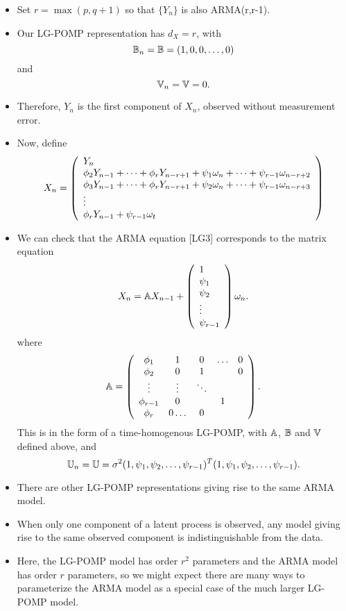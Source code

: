 \documentclass[]{article}
\begin{document}
\begin{itemize}
\item
  Set \(r=\max(p,q+1)\) so that \(\{Y_n\}\) is also ARMA(r,r-1).
\item
  Our LG-POMP representation has \(d_X=r\), with
  \[\mathbb{B}_n = \mathbb{B} = (1,0,0,\dots,0)\] and
  \[\mathbb{V}_n = \mathbb{V} = 0.\]
\item
  Therefore, \(Y_n\) is the first component of \(X_n\), observed without
  measurement error.
\item
  Now, define \[ X_n = \left(\begin{array}{l}
  Y_n \\
  \phi_2 Y_{n-1} + \dots + \phi_r Y_{n-r+1} + \psi_1 \omega_n + \dots +\psi_{r-1} \omega_{n-r+2}
  \\
  \phi_3 Y_{n-1} + \dots + \phi_r Y_{n-r+1} + \psi_2 \omega_n + \dots +\psi_{r-1} \omega_{n-r+3}
  \\
  \vdots
  \\
  \phi_r Y_{n-1} + \psi_{r-1} \omega_t
  \end{array}\right)\]
\item
  We can check that the ARMA equation {[}LG3{]} corresponds to the
  matrix equation \[ X_{n} = \mathbb{A} X_{n-1} + \left(\begin{array}{l}
  1 \\
  \psi_1\\
  \psi_2\\
  \vdots\\
  \psi_{r-1}
  \end{array}\right) \omega_n.
  \] where \[
  \mathbb{A} = 
  \left(\begin{array}{ccccc}
  \phi_1 & 1 & 0 & \ldots & 0 \\
  \phi_2 & 0 & 1 &       & 0 \\
  \vdots & \vdots& \ddots & \\
  \phi_{r-1} & 0 & & 1 \\
  \phi_{r} & 0 \ldots & 0
  \end{array}\right).\] This is in the form of a time-homogenous
  LG-POMP, with \(\mathbb{A}\), \(\mathbb{B}\) and \(\mathbb{V}\) defined above, and
  \[\mathbb{U}_n = \mathbb{U} = \sigma^2 (1, \psi_1,\psi_2,\dots,\psi_{r-1})^{\scriptsize{T}}(1, \psi_1,\psi_2,\dots,\psi_{r-1}).\]
\item
  There are other LG-POMP representations giving rise to the same ARMA
  model.
\item
  When only one component of a latent process is observed, any model
  giving rise to the same observed component is indistinguishable from
  the data.
\item
  Here, the LG-POMP model has order \(r^2\) parameters and the ARMA
  model has order \(r\) parameters, so we might expect there are many
  ways to parameterize the ARMA model as a special case of the much
  larger LG-POMP model.
\end{itemize}
\end{document}
